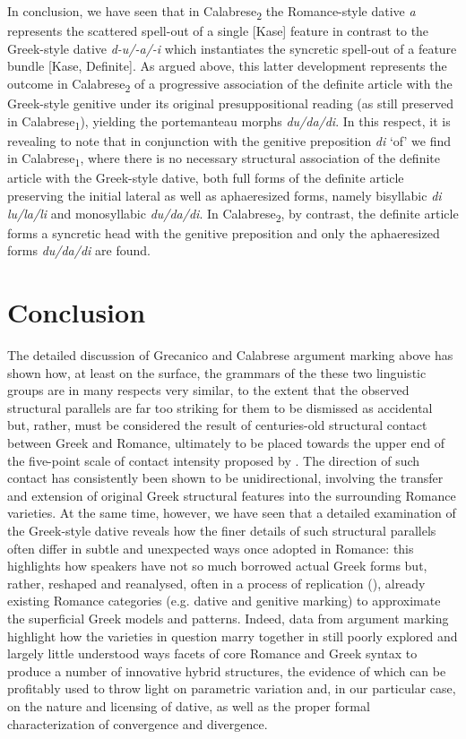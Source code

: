 \documentclass[output=paper,modfonts,nonflat]{langsci/langscibook}
\begin{document}
In conclusion, we have seen that in Calabrese\textsubscript{2} the Romance-style dative \textit{a} represents the scattered spell-out of a single [Kase] feature in contrast to the Greek-style dative \textit{d-u/-a/-i} which instantiates the syncretic spell-out of a feature bundle [Kase, Definite]. As argued above, this latter development represents the outcome in Calabrese\textsubscript{2} of a progressive association of the definite article with the Greek-style genitive under its original presuppositional reading (as still preserved in Calabrese\textsubscript{1}), yielding the portemanteau morphs \textit{du/da/di}. In this respect, it is revealing to note that in conjunction with the genitive preposition \textit{di} ‘of’ we find in Calabrese\textsubscript{1}, where there is no necessary structural association of the definite article with the Greek-style dative, both full forms of the definite article preserving the initial lateral as well as aphaeresized forms, namely bisyllabic \textit{di lu/la/li} and monosyllabic \textit{du/da/di}. In Calabrese\textsubscript{2}, by contrast, the definite article forms a syncretic head with the genitive preposition and only the aphaeresized forms \textit{du/da/di} are found.

\section{Conclusion}

The detailed discussion of Grecanico and Calabrese argument marking above has shown how, at least on the surface, the grammars of the these two linguistic groups are in many respects very similar, to the extent that the observed structural parallels are far too striking for them to be dismissed as accidental but, rather, must be considered the result of centuries-old structural contact between Greek and Romance, ultimately to be placed towards the upper end of the five-point scale of contact intensity proposed by \citet{Thomason1988}. The direction of such contact has consistently been shown to be unidirectional, involving the transfer and extension of original Greek structural features into the surrounding Romance varieties. At the same time, however, we have seen that a detailed examination of the Greek-style dative reveals how the finer details of such structural parallels often differ in subtle and unexpected ways once adopted in Romance: this highlights how speakers have not so much borrowed actual Greek forms but, rather, reshaped and reanalysed, often in a process of replication (\citealt{Heine2003, Heine2005}), already existing Romance categories (e.g. dative and genitive marking) to approximate the superficial Greek models and patterns. Indeed, data from argument marking highlight how the varieties in question marry together in still poorly explored and largely little understood ways facets of core Romance and Greek syntax to produce a number of innovative hybrid structures, the evidence of which can be profitably used to throw light on parametric variation and, in our particular case, on the nature and licensing of dative, as well as the proper formal characterization of convergence and divergence. 
\end{document}

